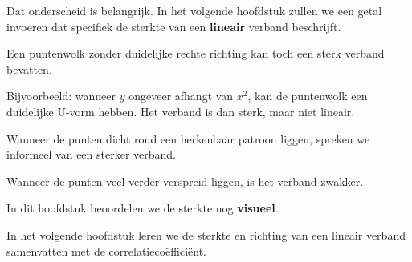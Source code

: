 \documentclass{ximera}
\begin{document}
Dat onderscheid is belangrijk. In het volgende hoofdstuk zullen we
een getal invoeren dat specifiek de sterkte van een
\textbf{lineair} verband beschrijft.

\begin{opmerking}
Een puntenwolk zonder duidelijke rechte richting kan toch een sterk
verband bevatten.

Bijvoorbeeld: wanneer $y$ ongeveer afhangt van $x^2$, kan de puntenwolk
een duidelijke U-vorm hebben. Het verband is dan sterk, maar niet lineair.
\end{opmerking}



Wanneer de punten dicht rond een herkenbaar patroon liggen, spreken
we informeel van een sterker verband.

Wanneer de punten veel verder verspreid liggen, is het verband zwakker.

\begin{center}
\end{center}

\begin{opmerking}
In dit hoofdstuk beoordelen we de sterkte nog \textbf{visueel}.

In het volgende hoofdstuk leren we de sterkte en richting van een
lineair verband samenvatten met de correlatiecoëfficiënt.
\end{opmerking}
\end{document}
